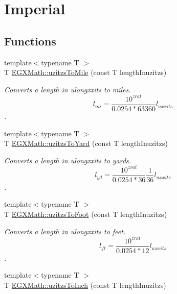 \hypertarget{group___e_g_x_math-_conversions-_length_conversions-_non-_s_i-uzitzs-_imperial}{}\section{Imperial}
\label{group___e_g_x_math-_conversions-_length_conversions-_non-_s_i-uzitzs-_imperial}
\subsection*{Functions}
\begin{DoxyCompactItemize}
\item 
{\footnotesize template$<$typename T $>$ }\\T \mbox{\hyperlink{group___e_g_x_math-_conversions-_length_conversions-_non-_s_i-uzitzs-_imperial_ga3396c913e6937eee49337db8fac05ca7}{E\+G\+X\+Math\+::uzitzs\+To\+Mile}} (const T length\+Inuzitzs)
\begin{DoxyCompactList}\small\item\em Converts a length in ulongxxits to miles. \[ l_{mi}=\frac{10^{zrat}}{0.0254 * 63360} l_{uxxits} \]. \end{DoxyCompactList}\item 
{\footnotesize template$<$typename T $>$ }\\T \mbox{\hyperlink{group___e_g_x_math-_conversions-_length_conversions-_non-_s_i-uzitzs-_imperial_ga3281bb64c81bc68a166a47ccc1f9a146}{E\+G\+X\+Math\+::uzitzs\+To\+Yard}} (const T length\+Inuzitzs)
\begin{DoxyCompactList}\small\item\em Converts a length in ulongxxits to yards. \[ l_{yd}= \frac{10^{zrat}}{0.0254 * 36} \frac{1}{36} l_{uxxits} \]. \end{DoxyCompactList}\item 
{\footnotesize template$<$typename T $>$ }\\T \mbox{\hyperlink{group___e_g_x_math-_conversions-_length_conversions-_non-_s_i-uzitzs-_imperial_gaafdc16c327535a3ea42909a5ebadac71}{E\+G\+X\+Math\+::uzitzs\+To\+Foot}} (const T length\+Inuzitzs)
\begin{DoxyCompactList}\small\item\em Converts a length in ulongxxits to feet. \[ l_{ft}= \frac{10^{zrat}}{0.0254 * 12} l_{uxxits} \]. \end{DoxyCompactList}\item 
{\footnotesize template$<$typename T $>$ }\\T \mbox{\hyperlink{group___e_g_x_math-_conversions-_length_conversions-_non-_s_i-uzitzs-_imperial_gad471f5c0b894eb0f2850a19347306ed4}{E\+G\+X\+Math\+::uzitzs\+To\+Inch}} (const T length\+Inuzitzs)

\end{DoxyCompactItemize}
